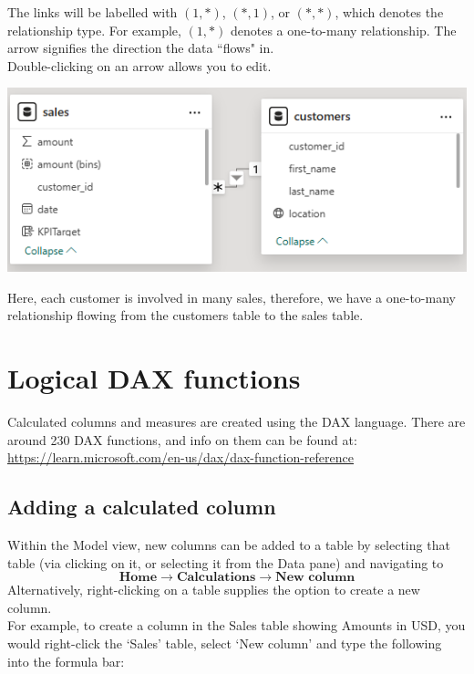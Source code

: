 \documentclass[10pt, openany, twocolumn]{book}
\begin{document}
The links will be labelled with $(1,*)$, $(*,1)$, or $(*,*)$, which denotes the relationship type. For example, $(1,*)$ denotes a one-to-many relationship. The arrow signifies the direction the data ``flows" in.\\

Double-clicking on an arrow allows you to edit. 

\begin{center}
    \includegraphics[width = 0.89\columnwidth]{images/relationship.png}
\end{center}
Here, each customer is involved in many sales, therefore, we have a one-to-many relationship flowing from the customers table to the sales table.
\section{Logical DAX functions}

Calculated columns and measures are created using the DAX language. There are around 230 DAX functions, and info on them can be found at:\\

\href{https://learn.microsoft.com/en-us/dax/dax-function-reference}{https://learn.microsoft.com/en-us/dax/dax-function-reference} \\

\subsection*{Adding a calculated column}

Within the Model view, new columns can be added to a table by selecting that table (via clicking on it, or selecting it from the Data pane) and navigating to
$$\textbf{Home} \rightarrow \textbf{Calculations} \rightarrow \textbf{New column}$$
Alternatively, right-clicking on a table supplies the option to create a new column.\\

For example, to create a column in the Sales table showing Amounts in USD, you would right-click the `Sales' table, select `New column' and type the following into the formula bar:
\end{document}
